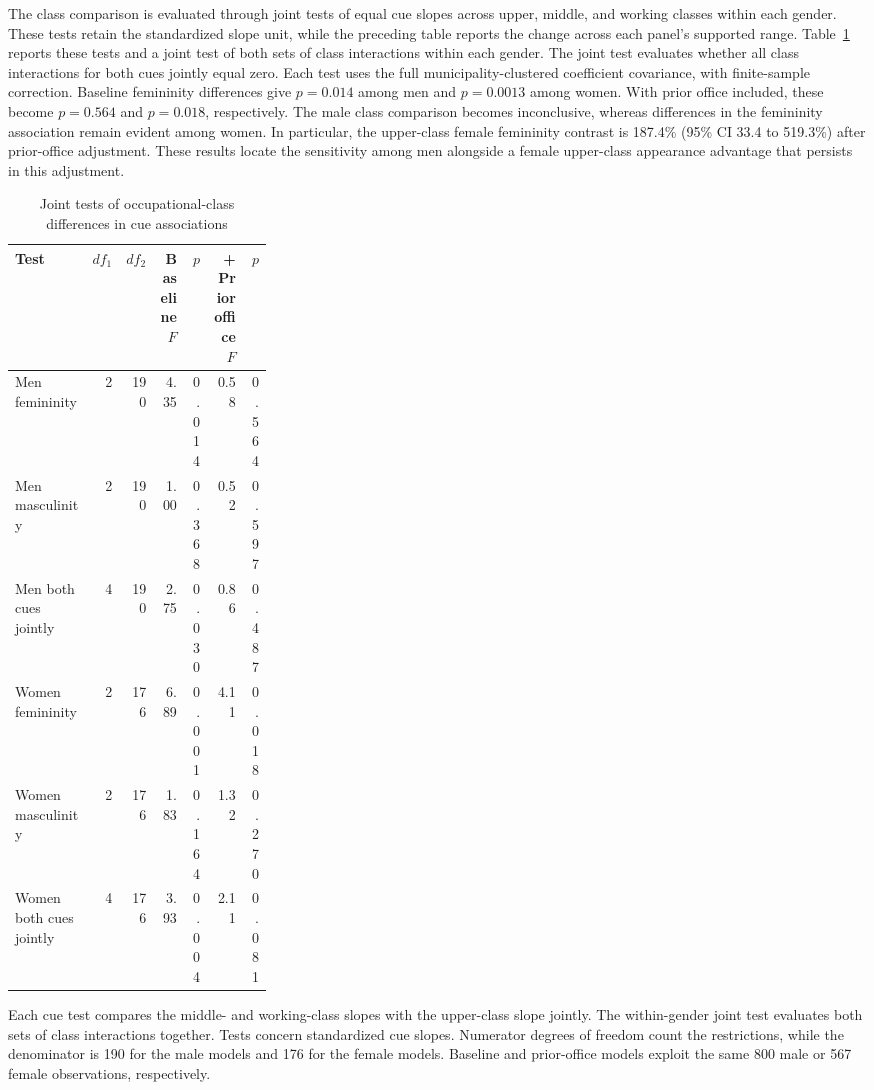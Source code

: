 \documentclass[11pt,a4paper]{article}\usepackage[]{graphicx}\usepackage[]{xcolor}
\begin{document}
The class comparison is evaluated through joint tests of equal cue slopes across upper, middle, and working classes within each gender. These tests retain the standardized slope unit, while the preceding table reports the change across each panel's supported range. Table~\ref{tab:oa-class-tests} reports these tests and a joint test of both sets of class interactions within each gender. The joint test evaluates whether all class interactions for both cues jointly equal zero. Each test uses the full municipality-clustered coefficient covariance, with finite-sample correction. Baseline femininity differences give $p=0.014$ among men and $p=0.0013$ among women. With prior office included, these become $p=0.564$ and $p=0.018$, respectively. The male class comparison becomes inconclusive, whereas differences in the femininity association remain evident among women. In particular, the upper-class female femininity contrast is 187.4\% (95\% CI 33.4 to 519.3\%) after prior-office adjustment. These results locate the sensitivity among men alongside a female upper-class appearance advantage that persists in this adjustment.

\begin{table}[!htbp]
\centering\small
\caption{Joint tests of occupational-class differences in cue associations}
\label{tab:oa-class-tests}
\begin{tabular}{p{0.30\linewidth}rrrrrr}
\toprule
Test & $df_1$ & $df_2$ & Baseline $F$ & $p$ & + Prior office $F$ & $p$ \\
\midrule
Men femininity & 2 & 190 & 4.35 & 0.014 & 0.58 & 0.564 \\
Men masculinity & 2 & 190 & 1.00 & 0.368 & 0.52 & 0.597 \\
Men both cues jointly & 4 & 190 & 2.75 & 0.030 & 0.86 & 0.487 \\
Women femininity & 2 & 176 & 6.89 & 0.001 & 4.11 & 0.018 \\
Women masculinity & 2 & 176 & 1.83 & 0.164 & 1.32 & 0.270 \\
Women both cues jointly & 4 & 176 & 3.93 & 0.004 & 2.11 & 0.081 \\
\bottomrule
\end{tabular}

\par\smallskip
\begin{minipage}{\linewidth}\footnotesize
Each cue test compares the middle- and working-class slopes with the upper-class slope jointly. The within-gender joint test evaluates both sets of class interactions together. Tests concern standardized cue slopes. Numerator degrees of freedom count the restrictions, while the denominator is 190 for the male models and 176 for the female models. Baseline and prior-office models exploit the same 800 male or 567 female observations, respectively.
\end{minipage}
\end{table}
\end{document}
